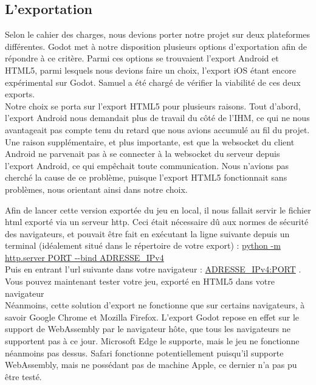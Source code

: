 \documentclass[a4paper,11pt]{article}
\begin{document}
\subsection{L’exportation}

    Selon le cahier des charges, nous devions porter notre projet sur deux plateformes différentes. Godot met à notre disposition plusieurs options d'exportation afin de répondre à ce critère. Parmi ces options se trouvaient l’export Android et HTML5, parmi lesquels nous devions faire un choix, l’export iOS étant encore expérimental sur Godot. Samuel a été chargé de vérifier la viabilité de ces deux exports. \\ 

    Notre choix se porta sur l’export HTML5 pour plusieurs raisons. Tout d’abord, l’export Android nous demandait plus de travail du côté de l’IHM, ce qui ne nous avantageait pas compte tenu du retard que nous avions accumulé au fil du projet. 
    Une raison supplémentaire, et plus importante, est que la websocket du client Android ne parvenait pas à se connecter à la websocket du serveur depuis l’export Android, ce qui empêchait toute communication. Nous n’avions pas cherché la cause de ce problème, puisque l’export HTML5 fonctionnait sans problèmes, nous orientant ainsi dans notre choix.  \\

\newpage

    Afin de lancer cette version exportée du jeu en local, il nous fallait servir le fichier html exporté via un serveur http. Ceci était nécessaire dû aux normes de sécurité des navigateurs, et pouvait être fait en exécutant la ligne suivante depuis un terminal (idéalement situé dans le répertoire de votre export) : 
\url{python -m http.server PORT --bind ADRESSE_IPv4} \\


    Puis en entrant l’url suivante dans votre navigateur :  \url{ADRESSE_IPv4:PORT} . Vous pouvez maintenant tester votre jeu, exporté en HTML5 dans votre navigateur \\

    Néanmoins, cette solution d’export ne fonctionne que sur certains navigateurs, à savoir Google Chrome et Mozilla Firefox. L’export Godot repose en effet sur le support de WebAssembly par le navigateur hôte, que tous les navigateurs ne supportent pas à ce jour. 
    Microsoft Edge le supporte, mais le jeu ne fonctionne néanmoins pas dessus. Safari fonctionne potentiellement puisqu’il supporte WebAssembly, mais ne possédant pas de machine Apple, ce dernier n’a pas pu être testé. \\
\end{document}
